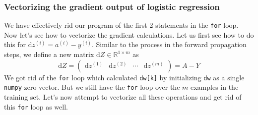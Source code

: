 \documentclass{article}[a4paper,12pt]
\theoremstyle{definition}
\begin{document}
\subsubsection{Vectorizing the gradient output of logistic regression}
We have effectively rid our program of the first 2 statements in the \texttt{for} loop. Now let's see how to vectorize the gradient calculations. Let us first see how to do this for $\text{d}z^{(i)}=a^{(i)}-y^{(i)}$. Similar to the process in the  forward propagation steps, we define a new matrix $\text{d}Z\in\mathbb{R}^{1\times m}$ as
$$\text{d}Z=\begin{pmatrix}
	\text{d}z^{(1)} & \text{d}z^{(2)} & \cdots & \text{d}z^{(m)}\\
\end{pmatrix}=A-Y$$
We got rid of the \texttt{for} loop which calculated \texttt{dw[k]} by initializing \texttt{dw} as a single \texttt{numpy} zero vector. But we still have the \texttt{for} loop over the $m$ examples in the training set. Let's now attempt to vectorize all these operations and get rid of this \texttt{for} loop as well.
\vspace{6pt}
\end{document}
